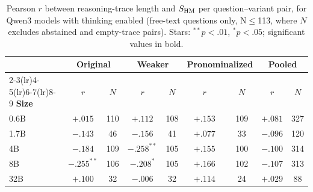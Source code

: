 \begin{table}[h]
\centering\small\setlength{\tabcolsep}{5pt}
\begin{tabular}{l cc cc cc cc}
\toprule
& \multicolumn{2}{c}{\textbf{Original}} & \multicolumn{2}{c}{\textbf{Weaker}} & \multicolumn{2}{c}{\textbf{Pronominalized}} & \multicolumn{2}{c}{\textbf{Pooled}} \\
\cmidrule(lr){2-3}\cmidrule(lr){4-5}\cmidrule(lr){6-7}\cmidrule(lr){8-9}
\textbf{Size} & $r$ & $N$ & $r$ & $N$ & $r$ & $N$ & $r$ & $N$ \\
\midrule
0.6B & $+.015$ & 110 & $+.112$ & 108 & $+.153$ & 109 & $+.081$ & 327 \\
1.7B & $-.143$ & 46 & $-.156$ & 41 & $+.077$ & 33 & $-.096$ & 120 \\
4B & $-.184$ & 109 & $\mathbf{-.258^{**}}$ & 105 & $+.155$ & 100 & $-.100$ & 314 \\
8B & $\mathbf{-.255^{**}}$ & 106 & $\mathbf{-.208^{*}}$ & 105 & $+.166$ & 102 & $-.107$ & 313 \\
32B & $+.100$ & 32 & $-.006$ & 32 & $+.114$ & 24 & $+.029$ & 88 \\
\bottomrule
\end{tabular}
\caption{Pearson $r$ between reasoning-trace length and $\sHM$ per question--variant pair, for Qwen3 models with thinking enabled (free-text questions only, N$\leq$113, where $N$ excludes abstained and empty-trace pairs). Stars: ${}^{**}p{<}.01$, ${}^{*}p{<}.05$; significant values in bold.}
\label{tab:think_trace_length_corr}
\end{table}